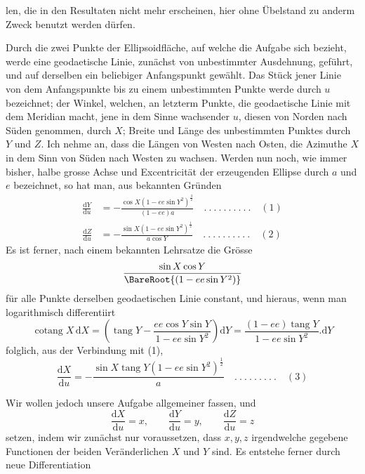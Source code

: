 %
len, die in den Resultaten nicht mehr erscheinen, hier ohne Übelstand zu anderm Zweck benutzt werden dürfen.

Durch die zwei Punkte der Ellipsoidfläche, auf welche die Aufgabe sich bezieht, werde eine geodaetische Linie, zunächst von unbestimmter Ausdehnung, geführt, und auf derselben ein beliebiger Anfangspunkt gewählt. Das Stück jener Linie von dem Anfangspunkte bis zu einem unbestimmten Punkte werde durch \(u\) bezeichnet; der Winkel, welchen, an letzterm Punkte, die geodaetische Linie mit dem Meridian macht, jene in dem Sinne wachsender \(u\), diesen von Norden nach Süden genommen, durch \(X\); Breite und Länge des unbestimmten Punktes durch \(Y\) und \(Z\). Ich nehme an, dass die Längen von Westen nach Osten, die Azimuthe \(X\) in dem Sinn von Süden nach Westen zu wachsen. Werden nun noch, wie immer bisher, halbe grosse Achse und Excentricität der erzeugenden Ellipse durch \(a\) und \(e\) bezeichnet, so hat man, aus bekannten Gründen
\[
\begin{aligned}
\frac{\mathrm{d}Y}{\mathrm{d}u}&=-\frac{\cos X(1-ee\sin Y^2)^{\frac32}}{(1-ee)a}\quad .\ .\ .\ .\ .\ .\ .\ .\ .\ .\quad(1)\\
\frac{\mathrm{d}Z}{\mathrm{d}u}&=-\frac{\sin X(1-ee\sin Y^2)^{\frac12}}{a\cos Y}\quad .\ .\ .\ .\ .\ .\ .\ .\ .\ .\quad(2)
\end{aligned}
\]
Es ist ferner, nach einem bekannten Lehrsatze die Grösse
\[
\frac{\sin X\cos Y}{\BareRoot{(1-ee\sin Y^2)}}
\]
für alle Punkte derselben geodaetischen Linie constant, und hieraus, wenn man logarithmisch differentiirt
\[
\operatorname{cotang}X\,\mathrm{d}X=(\operatorname{tang}Y-\frac{ee\cos Y\sin Y}{1-ee\sin Y^2})\mathrm{d}Y=\frac{(1-ee)\operatorname{tang}Y}{1-ee\sin Y^2}\mathord{.}\mathrm{d}Y
\]
folglich, aus der Verbindung mit (1),
\[
\frac{\mathrm{d}X}{\mathrm{d}u}=-\frac{\sin X\operatorname{tang}Y(1-ee\sin Y^2)^{\frac12}}{a}\quad .\ .\ .\ .\ .\ .\ .\ .\ .\quad(3)
\]

\indent Wir wollen jedoch unsere Aufgabe allgemeiner fassen, und
\[
\frac{\mathrm{d}X}{\mathrm{d}u}=x,\qquad\frac{\mathrm{d}Y}{\mathrm{d}u}=y,\qquad\frac{\mathrm{d}Z}{\mathrm{d}u}=z
\]
setzen, indem wir zunächst nur voraussetzen, dass \(x,y,z\) irgendwelche gegebene Functionen der beiden Veränderlichen \(X\) und \(Y\) sind. Es entstehe ferner durch neue Differentiation

